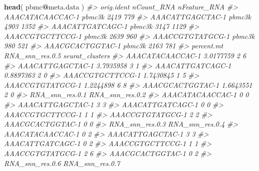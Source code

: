 \documentclass[
]{book}
\newenvironment{Shaded}{\begin{snugshade}}{\end{snugshade}}
\newcommand{\CommentTok}[1]{\textcolor[rgb]{0.56,0.35,0.01}{\textit{#1}}}
\newcommand{\FunctionTok}[1]{\textcolor[rgb]{0.13,0.29,0.53}{\textbf{#1}}}
\newcommand{\NormalTok}[1]{#1}
\newcommand{\SpecialCharTok}[1]{\textcolor[rgb]{0.81,0.36,0.00}{\textbf{#1}}}
\begin{document}
\begin{Shaded}
\begin{Highlighting}[]
\FunctionTok{head}\NormalTok{( pbmc}\SpecialCharTok{@}\NormalTok{meta.data )}
\CommentTok{\#\textgreater{}                  orig.ident nCount\_RNA nFeature\_RNA}
\CommentTok{\#\textgreater{} AAACATACAACCAC{-}1     pbmc3k       2419          779}
\CommentTok{\#\textgreater{} AAACATTGAGCTAC{-}1     pbmc3k       4903         1352}
\CommentTok{\#\textgreater{} AAACATTGATCAGC{-}1     pbmc3k       3147         1129}
\CommentTok{\#\textgreater{} AAACCGTGCTTCCG{-}1     pbmc3k       2639          960}
\CommentTok{\#\textgreater{} AAACCGTGTATGCG{-}1     pbmc3k        980          521}
\CommentTok{\#\textgreater{} AAACGCACTGGTAC{-}1     pbmc3k       2163          781}
\CommentTok{\#\textgreater{}                  percent.mt RNA\_snn\_res.0.5 seurat\_clusters}
\CommentTok{\#\textgreater{} AAACATACAACCAC{-}1  3.0177759               2               6}
\CommentTok{\#\textgreater{} AAACATTGAGCTAC{-}1  3.7935958               3               1}
\CommentTok{\#\textgreater{} AAACATTGATCAGC{-}1  0.8897363               2               0}
\CommentTok{\#\textgreater{} AAACCGTGCTTCCG{-}1  1.7430845               1               5}
\CommentTok{\#\textgreater{} AAACCGTGTATGCG{-}1  1.2244898               6               8}
\CommentTok{\#\textgreater{} AAACGCACTGGTAC{-}1  1.6643551               2               0}
\CommentTok{\#\textgreater{}                  RNA\_snn\_res.0.1 RNA\_snn\_res.0.2}
\CommentTok{\#\textgreater{} AAACATACAACCAC{-}1               0               0}
\CommentTok{\#\textgreater{} AAACATTGAGCTAC{-}1               3               3}
\CommentTok{\#\textgreater{} AAACATTGATCAGC{-}1               0               0}
\CommentTok{\#\textgreater{} AAACCGTGCTTCCG{-}1               1               1}
\CommentTok{\#\textgreater{} AAACCGTGTATGCG{-}1               2               2}
\CommentTok{\#\textgreater{} AAACGCACTGGTAC{-}1               0               0}
\CommentTok{\#\textgreater{}                  RNA\_snn\_res.0.3 RNA\_snn\_res.0.4}
\CommentTok{\#\textgreater{} AAACATACAACCAC{-}1               0               2}
\CommentTok{\#\textgreater{} AAACATTGAGCTAC{-}1               3               3}
\CommentTok{\#\textgreater{} AAACATTGATCAGC{-}1               0               2}
\CommentTok{\#\textgreater{} AAACCGTGCTTCCG{-}1               1               1}
\CommentTok{\#\textgreater{} AAACCGTGTATGCG{-}1               2               6}
\CommentTok{\#\textgreater{} AAACGCACTGGTAC{-}1               0               2}
\CommentTok{\#\textgreater{}                  RNA\_snn\_res.0.6 RNA\_snn\_res.0.7}

\end{Highlighting}
\end{Shaded}
\end{document}
